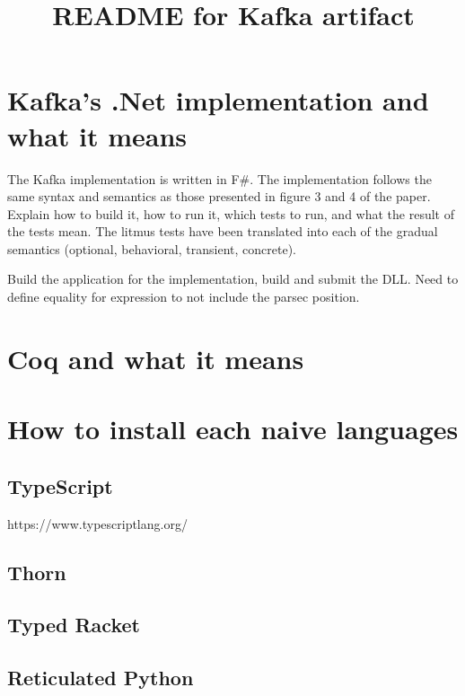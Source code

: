 \documentclass[]{article}
\title{README for Kafka artifact}
\author{}
\date{}
\begin{document}
\maketitle

\section{Kafka's .Net implementation and what it means}

The Kafka implementation is written in F$\#$. The implementation follows the same syntax and semantics as those presented in figure 3 and 4 of the paper. Explain how to build it, how to run it, which tests to run, and what the result of the tests mean. The litmus tests have been translated into each of the gradual semantics (optional, behavioral, transient, concrete).

Build the application for the implementation, build and submit the DLL. Need to define equality for expression to not include the parsec position. 


\section{Coq and what it means}



\section{How to install each naive languages}



\subsection{TypeScript}

https://www.typescriptlang.org/


\subsection{Thorn}



\subsection{Typed Racket}



\subsection{Reticulated Python}
\end{document}

